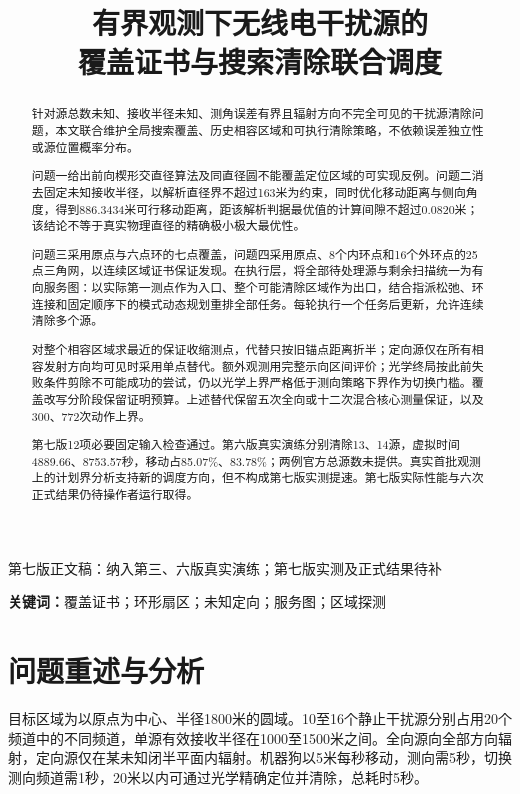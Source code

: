 \documentclass[UTF8,a4paper,zihao=-4,fontset=windows]{ctexart}
\title{有界观测下无线电干扰源的\\覆盖证书与搜索清除联合调度}
\author{}
\date{}
\begin{document}
\maketitle
\vspace{-2.8em}
\begin{center}\small 第七版正文稿：纳入第三、六版真实演练；第七版实测及正式结果待补\end{center}

\begin{abstract}
针对源总数未知、接收半径未知、测角误差有界且辐射方向不完全可见的干扰源清除问题，本文联合维护全局搜索覆盖、历史相容区域和可执行清除策略，不依赖误差独立性或源位置概率分布。

问题一给出前向楔形交直径算法及同直径圆不能覆盖定位区域的可实现反例。问题二消去固定未知接收半径，以解析直径界不超过163米为约束，同时优化移动距离与侧向角度，得到886.3434米可行移动距离，距该解析判据最优值的计算间隙不超过0.0820米；该结论不等于真实物理直径的精确极小极大最优性。

问题三采用原点与六点环的七点覆盖，问题四采用原点、8个内环点和16个外环点的25点三角网，以连续区域证书保证发现。在执行层，将全部待处理源与剩余扫描统一为有向服务图：以实际第一测点作为入口、整个可能清除区域作为出口，结合指派松弛、环连接和固定顺序下的模式动态规划重排全部任务。每轮执行一个任务后更新，允许连续清除多个源。

对整个相容区域求最近的保证收缩测点，代替只按旧锚点距离折半；定向源仅在所有相容发射方向均可见时采用单点替代。额外观测用完整示向区间评价；光学终局按此前失败条件剪除不可能成功的尝试，仍以光学上界严格低于测向策略下界作为切换门槛。覆盖改写分阶段保留证明预算。上述替代保留五次全向或十二次混合核心测量保证，以及300、772次动作上界。

第七版12项必要固定输入检查通过。第六版真实演练分别清除13、14源，虚拟时间4889.66、8753.57秒，移动占85.07\%、83.78\%；两例官方总源数未提供。真实首批观测上的计划界分析支持新的调度方向，但不构成第七版实测提速。第七版实际性能与六次正式结果仍待操作者运行取得。
\end{abstract}

\noindent\textbf{关键词：}覆盖证书；环形扇区；未知定向；服务图；区域探测
\newpage

\section{问题重述与分析}
目标区域为以原点为中心、半径1800米的圆域。10至16个静止干扰源分别占用20个频道中的不同频道，单源有效接收半径在1000至1500米之间。全向源向全部方向辐射，定向源仅在某未知闭半平面内辐射。机器狗以5米每秒移动，测向需5秒，切换测向频道需1秒，20米以内可通过光学精确定位并清除，总耗时5秒\cite{problem,manual,protocol}。
\end{document}
